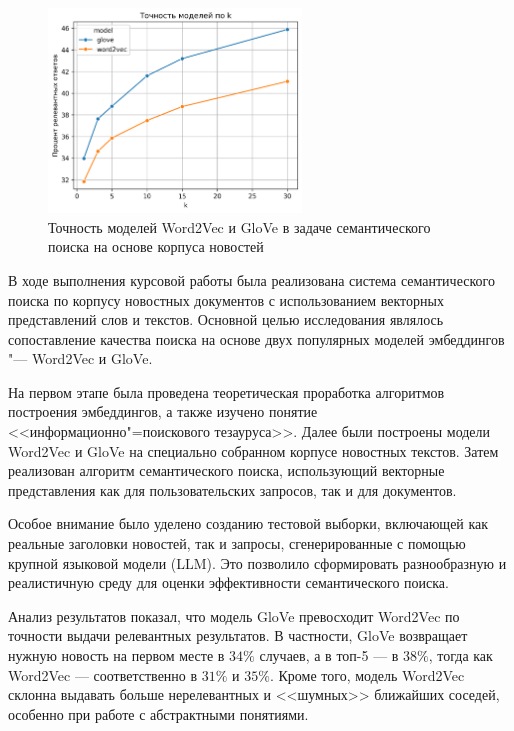 \documentclass[coursework]{SCWorks}
\begin{document}
\begin{figure}[!ht]
    \centering
    \includegraphics[width=0.6\textwidth]{accuracy_by_model.png}
    \caption{Точность моделей Word2Vec и GloVe в задаче семантического поиска на основе корпуса новостей}
    \label{fig:search-analyse}
\end{figure}

\conclusion

В ходе выполнения курсовой работы была реализована система семантического поиска по корпусу новостных документов с использованием векторных представлений слов и текстов. Основной целью исследования являлось сопоставление качества поиска на основе двух популярных моделей эмбеддингов "--- Word2Vec и GloVe.

На первом этапе была проведена теоретическая проработка алгоритмов построения эмбеддингов, а также изучено понятие <<информационно"=поискового тезауруса>>. Далее были построены модели Word2Vec и GloVe на специально собранном корпусе новостных текстов. Затем реализован алгоритм семантического поиска, использующий векторные представления как для пользовательских запросов, так и для документов.

Особое внимание было уделено созданию тестовой выборки, включающей как реальные заголовки новостей, так и запросы, сгенерированные с помощью крупной языковой модели (LLM). Это позволило сформировать разнообразную и реалистичную среду для оценки эффективности семантического поиска.

Анализ результатов показал, что модель GloVe превосходит Word2Vec по точности выдачи релевантных результатов. В частности, GloVe возвращает нужную новость на первом месте в $34\%$ случаев, а в топ-5 — в $38\%$, тогда как Word2Vec — соответственно в $31\%$ и $35\%$. Кроме того, модель Word2Vec склонна выдавать больше нерелевантных и <<шумных>>  ближайших соседей, особенно при работе с абстрактными понятиями.
\end{document}
